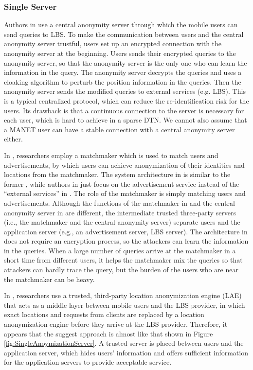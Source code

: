 \subsubsection{ Single Server}

\noindent Authors in \cite {C15} use a central anonymity server through which the mobile users can send queries to LBS. To make the communication between users and the central anonymity server trustful, users set up an encrypted connection with the anonymity server at the beginning. Users sends their encrypted queries to the anonymity server, so that the anonymity server is the only one who can learn the information in the query. The anonymity server decrypts the queries and uses a cloaking algorithm to perturb the position information in the queries. Then the anonymity server sends the modified queries to external services (e.g. LBS). This is a typical centralized protocol, which can reduce the re-identification risk for the users. Its drawback is that a continuous connection to the server is necessary for each user, which is hard to achieve in a sparse DTN. We cannot also assume that a MANET user can have a stable connection with a central anonymity server either.

In \cite {C23}, researchers employ a matchmaker which is used to match users and advertisements, by which users can achieve anonymization of their identities and locations from the matchmaker. The system architecture in \cite {C23} is similar to the former \cite {C15}, while authors in \cite {C23} just focus on the advertisement service instead of the ``external services'' in \cite{C15}. The role of the matchmaker is simply matching users and advertisements. Although the functions of the matchmaker in \cite {C23} and the central anonymity server in \cite {C15} are different, the intermediate trusted three-party servers (i.e., the matchmaker and the central anonymity server) separate users and the application server (e.g., an advertisement server, LBS server). The architecture in \cite {C23} does not require an encryption process, so the attackers can learn the information in the queries. When a large number of queries arrive at the matchmaker in a short time from different users, it helps the matchmaker mix the queries so that attackers can hardly trace the query, but the burden of the users who are near the matchmaker can be heavy.

In \cite {C24}, researchers use a trusted, third-party location anonymization engine (LAE) that acts as a middle layer between mobile users and the LBS provider, in which exact locations and requests from clients are replaced by a location anonymization engine before they arrive at the LBS provider. Therefore, it appears that the suggest approach is almost like that shown in Figure \ref{fig:SingleAnoymizationServer}. A trusted server is placed between users and the application server, which hides users' information and offers sufficient information for the application servers to provide acceptable service. 

